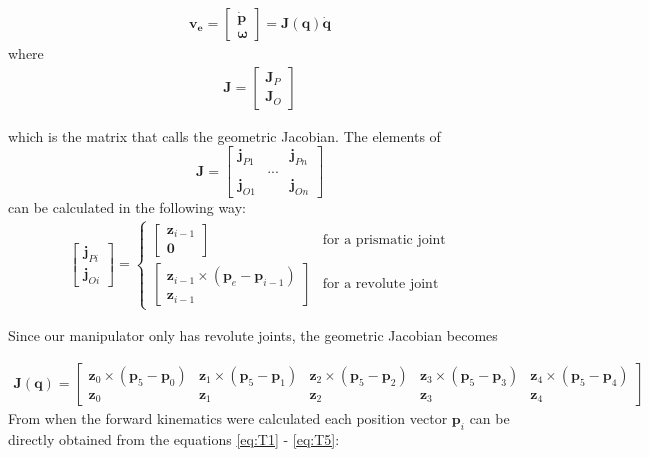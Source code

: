 \begin{align*}
    \bm{v_e} = 
    \begin{bmatrix}
        \dot{\bm{p}} \\ \bm{\omega}
    \end{bmatrix}
    = \bm{J}(\bm{q})\dot{\bm{q}}
\end{align*}
where
\begin{align*}
    \bm{J} = 
    \begin{bmatrix}
        \bm{J}_P \\ \bm{J}_O
    \end{bmatrix}
\end{align*}

which is the matrix that \cite{Siciliano} calls the geometric Jacobian. The elements of 
$$
\bm{J} = 
\begin{bmatrix}
    \bm{j}_{P1} & & \bm{j}_{Pn}\\
    &...&\\
    \bm{j}_{O1} & & \bm{j}_{On}
\end{bmatrix}
$$
can be calculated in the following way:
\begin{align*}
    \begin{bmatrix}
        \bm{j}_{Pi}\\\bm{j}_{Oi}
    \end{bmatrix}
    =
    \begin{cases}
        \begin{bmatrix} \bm{z}_{i-1}\\ \bm{0} \end{bmatrix} & \text{for a prismatic joint}\\
        \begin{bmatrix} \bm{z}_{i-1} \times (\bm{p}_e-\bm{p}_{i-1}) \\ \bm{z}_{i-1} \end{bmatrix} & \text{for a revolute joint}
    \end{cases}
\end{align*}

Since our manipulator only has revolute joints, the geometric Jacobian becomes

\begin{align*}
    \bm{J}(\bm{q}) = 
    \begin{bmatrix}
        \bm{z}_0 \times (\bm{p}_5-\bm{p}_0) & 
        \bm{z}_1 \times (\bm{p}_5-\bm{p}_1) & 
        \bm{z}_2 \times (\bm{p}_5-\bm{p}_2) & 
        \bm{z}_3 \times (\bm{p}_5-\bm{p}_3) & 
        \bm{z}_4 \times (\bm{p}_5-\bm{p}_4) \\
        \bm{z}_0 &
        \bm{z}_1 &
        \bm{z}_2 &
        \bm{z}_3 &
        \bm{z}_4
    \end{bmatrix}
\end{align*}
From when the forward kinematics were calculated each position vector $\bm{p}_i$ can be directly obtained from the equations \eqref{eq:T1} - \eqref{eq:T5}:



